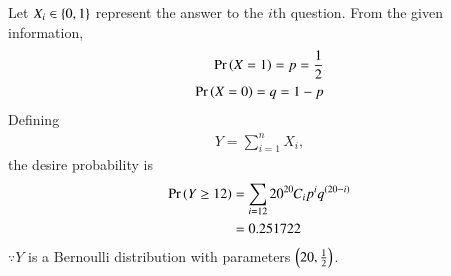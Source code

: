 Let $X_i \in \left\{0,1\right\}$ represent the answer to the $i$th question.  From the given information,
\begin{align}
\Pr\left(X=1\right) = p = \frac{1}{2}
\\
\Pr\left(X=0\right) = q = 1-p
\end{align}
%
Defining 
\begin{align}
Y = \sum_{i=1}^{n}X_i,
\end{align}
the desire probability is
\begin{align}
\Pr\left(Y \ge 12\right) &= \sum_{i=12}{20} {{}^{20}\mkern-1muC_{i}}p^i q^{(20-i)} 
\\
&= 0.251722
\end{align}
$\because Y$  is a Bernoulli distribution with parameters $\left(20,\frac{1}{2}\right)$.
